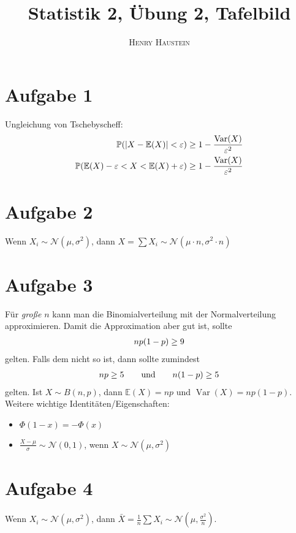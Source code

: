 \documentclass{article}
\title{\textbf{Statistik 2, Übung 2, Tafelbild}}
\author{\textsc{Henry Haustein}}
\date{}
\DeclareMathOperator{\Var}{Var}
\newcommand{\E}{\mathbb{E}}
\begin{document}
	\maketitle
	
	\section*{Aufgabe 1}
	Ungleichung von Tschebyscheff:
	\begin{align}
		\mathbb{P}(\vert X-\E(X)\vert < \varepsilon) &\ge 1 - \frac{\Var(X)}{\varepsilon^2} \notag \\
		\mathbb{P}(\E(X) - \varepsilon < X < \E(X) + \varepsilon) &\ge 1 - \frac{\Var(X)}{\varepsilon^2} \notag
	\end{align}

	\section*{Aufgabe 2}
	Wenn $X_i\sim \mathcal{N}(\mu, \sigma^2)$, dann $X = \sum X_i \sim\mathcal{N}(\mu\cdot n, \sigma^2\cdot n)$

	\section*{Aufgabe 3}
	Für \textit{große} $n$ kann man die Binomialverteilung mit der Normalverteilung approximieren. Damit die Approximation aber gut ist, sollte
	\begin{align}
		np(1-p) \ge 9 \notag
	\end{align}
	gelten. Falls dem nicht so ist, dann sollte zumindest
	\begin{align}
		np\ge 5\qquad\text{und} \qquad n(1-p)\ge 5 \notag
	\end{align}
	gelten. Ist $X\sim B(n,p)$, dann $\E(X) = np$ und $\Var(X) = np(1-p)$. Weitere wichtige Identitäten/Eigenschaften:
	\begin{itemize}
		\item $\Phi(1-x) = -\Phi(x)$
		\item $\frac{X-\mu}{\sigma}\sim \mathcal{N}(0,1)$, wenn $X\sim\mathcal{N}(\mu, \sigma^2)$
	\end{itemize}
	
	\section*{Aufgabe 4}
	Wenn $X_i\sim \mathcal{N}(\mu, \sigma^2)$, dann $\bar{X} = \frac{1}{n}\sum X_i \sim\mathcal{N}(\mu, \frac{\sigma^2}{n})$.
	
\end{document}
